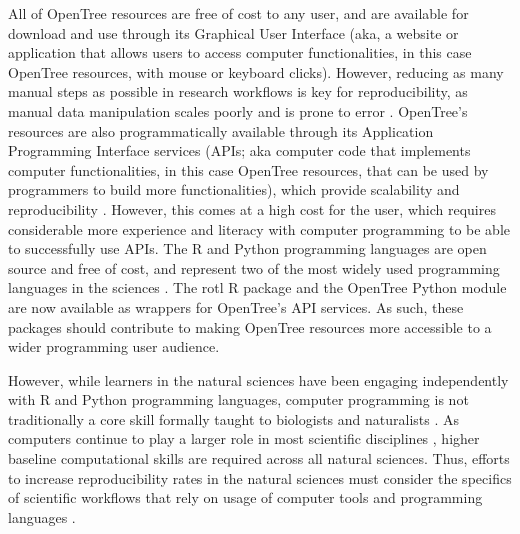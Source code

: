\documentclass[12pt]{article}
\begin{document}
All of OpenTree resources
are free of cost to any user, and are available for download and use through its Graphical User
Interface (aka, a website or application that allows users to access computer functionalities, in this case OpenTree resources, with mouse or keyboard clicks).
However, reducing as many manual steps as possible in research workflows is key
for reproducibility, as manual data manipulation scales poorly and is prone to
error \citep{bakken2019journey}.
OpenTree's resources are also programmatically available through its Application
Programming Interface services (APIs; aka computer code that implements computer functionalities,
in this case OpenTree resources, that can be used by programmers
to build more functionalities),
which provide scalability and reproducibility \citep{opentreeAPIv3}.
However, this comes at a high cost for the user, which requires considerable more
experience and literacy with computer programming to be able to successfully use APIs.
The R and Python programming languages are open source and free of cost, and represent
two of the most widely used programming languages in the sciences \citep{baker2017scientific}.
The rotl R package \citep{michonneau2016rotl} and the OpenTree Python module
\citep{mctavish2021opentree} are now available as wrappers for OpenTree's API services.
As such, these packages should contribute to making OpenTree resources more accessible
to a wider programming user audience.

However, while learners in the natural sciences have been engaging independently
with R and Python programming languages, computer programming is not traditionally
a core skill formally taught to biologists and naturalists
\citep{sayres2018bioinformatics, wright2019the, williams2019barriers}.
As computers continue to play a larger role in most scientific disciplines \citep{piccolo2016tools},
higher baseline computational skills are required across all natural sciences.
Thus, efforts to increase reproducibility rates in the natural sciences must consider
the specifics of scientific workflows that rely on usage of computer tools and
programming languages \citep{peng2011reproducible, sandve2013ten, powers2019open}.
\end{document}
